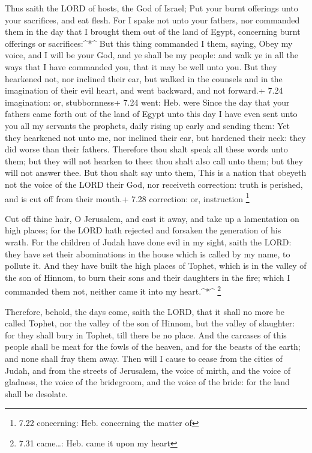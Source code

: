 Thus saith the LORD of hosts, the God of Israel; Put your
burnt offerings unto your sacrifices, and eat flesh.  For I
spake not unto your fathers, nor commanded them in the day that I
brought them out of the land of Egypt, concerning burnt offerings or
sacrifices:\^{}*\^{}  But this thing commanded I them,
saying, Obey my voice, and I will be your God, and ye shall be my
people: and walk ye in all the ways that I have commanded you, that it
may be well unto you.  But they hearkened not, nor inclined
their ear, but walked in the counsels and in the imagination of their
evil heart, and went backward, and not forward.+ 7.24 imagination: or,
stubbornness+ 7.24 went: Heb. were  Since the day that your
fathers came forth out of the land of Egypt unto this day I have even
sent unto you all my servants the prophets, daily rising up early and
sending them:  Yet they hearkened not unto me, nor inclined
their ear, but hardened their neck: they did worse than their fathers.
 Therefore thou shalt speak all these words unto them; but
they will not hearken to thee: thou shalt also call unto them; but they
will not answer thee.  But thou shalt say unto them, This
is a nation that obeyeth not the voice of the LORD their God, nor
receiveth correction: truth is perished, and is cut off from their
mouth.+ 7.28 correction: or, instruction \footnote{7.22 concerning: Heb.
  concerning the matter of}

 Cut off thine hair, O Jerusalem, and cast it away, and
take up a lamentation on high places; for the LORD hath rejected and
forsaken the generation of his wrath.  For the children of
Judah have done evil in my sight, saith the LORD: they have set their
abominations in the house which is called by my name, to pollute it.
 And they have built the high places of Tophet, which is in
the valley of the son of Hinnom, to burn their sons and their daughters
in the fire; which I commanded them not, neither came it into my
heart.\^{}*\^{} \footnote{7.31 came\ldots: Heb. came it upon my heart}

 Therefore, behold, the days come, saith the LORD, that it
shall no more be called Tophet, nor the valley of the son of Hinnom, but
the valley of slaughter: for they shall bury in Tophet, till there be no
place.  And the carcases of this people shall be meat for
the fowls of the heaven, and for the beasts of the earth; and none shall
fray them away.  Then will I cause to cease from the cities
of Judah, and from the streets of Jerusalem, the voice of mirth, and the
voice of gladness, the voice of the bridegroom, and the voice of the
bride: for the land shall be desolate.

